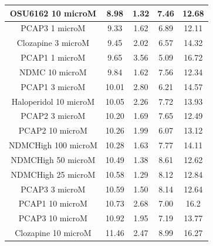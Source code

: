 \documentclass[a4paper,12pt]{article}
\begin{document}
\begin{table}[h!]
\begin{tabular}{|c|c|c|c|c|}
OSU6162 10 microM      & 8.98  & 1.32 & 7.46 & 12.68 \\ \hline
PCAP3 1 microM       & 9.33  & 1.62 & 6.89 & 12.11 \\ \hline
Clozapine 3 microM     & 9.45  & 2.02 & 6.57 & 14.32 \\ \hline
PCAP1 1 microM         & 9.65  & 3.56 & 5.09 & 16.72 \\ \hline
NDMC 10 microM         & 9.84  & 1.62 & 7.56 & 12.34 \\ \hline
PCAP1 3 microM         & 10.01 & 2.80  & 6.21 & 14.57 \\ \hline
Haloperidol 10 microM  & 10.05 & 2.26 & 7.72 & 13.93 \\ \hline
PCAP2 3 microM         & 10.20  & 1.69 & 7.65 & 12.49 \\ \hline
PCAP2 10 microM        & 10.26 & 1.99 & 6.07 & 13.12 \\ \hline
NDMCHigh 100 microM    & 10.28 & 1.63 & 7.77 & 14.11 \\ \hline
NDMCHigh 50 microM     & 10.49 & 1.38 & 8.61 & 12.62 \\ \hline
NDMCHigh 25 microM     & 10.58 & 1.29 & 8.12 & 12.84 \\ \hline
PCAP3 3 microM       & 10.59 & 1.50  & 8.14 & 12.64 \\ \hline
PCAP1 10 microM        & 10.73 & 2.68 & 7.00    & 16.2  \\ \hline
PCAP3 10 microM      & 10.92 & 1.95 & 7.19 & 13.77 \\ \hline
Clozapine 10 microM    & 11.46 & 2.47 & 8.99 & 16.27 \\ \hline
\end{tabular}
\end{table}
\newpage
\end{document}
